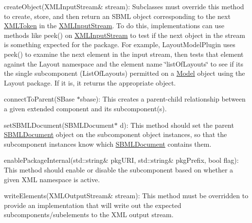 \begin{DoxyItemize}
\item {\ttfamily create\+Object(\+X\+M\+L\+Input\+Stream\& stream)}\+: Subclasses must override this method to create, store, and then return an S\+B\+ML object corresponding to the next \hyperlink{class_x_m_l_token}{X\+M\+L\+Token} in the \hyperlink{class_x_m_l_input_stream}{X\+M\+L\+Input\+Stream}. To do this, implementations can use methods like {\ttfamily peek()} on \hyperlink{class_x_m_l_input_stream}{X\+M\+L\+Input\+Stream} to test if the next object in the stream is something expected for the package. For example, Layout\+Model\+Plugin uses {\ttfamily peek()} to examine the next element in the input stream, then tests that element against the Layout namespace and the element name {\ttfamily \char`\"{}list\+Of\+Layouts\char`\"{}} to see if it\textquotesingle{}s the single subcomponent (List\+Of\+Layouts) permitted on a \hyperlink{class_model}{Model} object using the Layout package. If it is, it returns the appropriate object.\end{DoxyItemize}
\begin{DoxyItemize}
\item {\ttfamily connect\+To\+Parent(\+S\+Base $\ast$sbase)}\+: This creates a parent-\/child relationship between a given extended component and its subcomponent(s).\end{DoxyItemize}
\begin{DoxyItemize}
\item {\ttfamily set\+S\+B\+M\+L\+Document(\+S\+B\+M\+L\+Document$\ast$ d)}\+: This method should set the parent \hyperlink{class_s_b_m_l_document}{S\+B\+M\+L\+Document} object on the subcomponent object instances, so that the subcomponent instances know which \hyperlink{class_s_b_m_l_document}{S\+B\+M\+L\+Document} contains them.\end{DoxyItemize}
\begin{DoxyItemize}
\item {\ttfamily enable\+Package\+Internal(std\+::string\& pkg\+U\+RI, std\+::string\& pkg\+Prefix, bool flag)}\+: This method should enable or disable the subcomponent based on whether a given X\+ML namespace is active.\end{DoxyItemize}
\begin{DoxyItemize}
\item {\ttfamily write\+Elements(\+X\+M\+L\+Output\+Stream\& stream)}\+: This method must be overridden to provide an implementation that will write out the expected subcomponents/subelements to the X\+ML output stream.\end{DoxyItemize}
